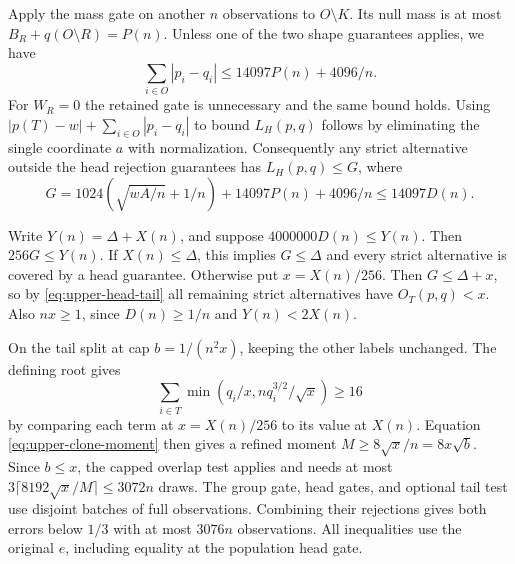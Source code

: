 Apply the mass gate on another \(n\) observations to \(O\setminus K\).
Its null mass is at most \(B_R+q(O\setminus R)=P(n)\).
Unless one of the two shape guarantees applies, we have
\[
 \sum_{i\in O}|p_i-q_i|
 \le 14097P(n)+4096/n .
\]
For \(W_R=0\) the retained gate is unnecessary and the same bound holds.
Using \(|p(T)-w|+\sum_{i\in O}|p_i-q_i|\) to bound \(L_H(p,q)\)
follows by eliminating the single coordinate \(a\) with normalization.
Consequently any strict alternative outside the head rejection guarantees
has \(L_H(p,q)\le G\), where
\[
 G=1024\left(\sqrt{wA/n}+1/n\right)+14097P(n)+4096/n
 \le 14097D(n).
\]

Write \(Y(n)=\Delta+X(n)\), and suppose \(4000000D(n)\le Y(n)\).
Then \(256G\le Y(n)\). If \(X(n)\le\Delta\), this implies \(G\le\Delta\)
and every strict alternative is covered by a head guarantee.
Otherwise put \(x=X(n)/256\). Then \(G\le\Delta+x\), so by
\eqref{eq:upper-head-tail} all remaining strict alternatives have
\(O_T(p,q)<x\). Also \(nx\ge1\), since \(D(n)\ge1/n\) and
\(Y(n)<2X(n)\).

On the tail split at cap \(b=1/(n^2x)\), keeping the other labels
unchanged. The defining root gives
\[
 \sum_{i\in T}\min(q_i/x,nq_i^{3/2}/\sqrt x)\ge16
\]
by comparing each term at \(x=X(n)/256\) to its value at \(X(n)\).
Equation \eqref{eq:upper-clone-moment} then gives a refined moment
\(M\ge8\sqrt x/n=8x\sqrt b\).
Since \(b\le x\), the capped overlap test applies and needs at most
\(3\lceil8192\sqrt x/M\rceil\le3072n\) draws.
The group gate, head gates, and optional tail test use disjoint
batches of full observations. Combining their rejections gives both
errors below \(1/3\) with at most \(3076n\) observations. All inequalities
use the original \(e\), including equality at the population head gate.
